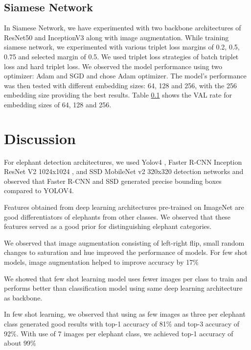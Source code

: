 \documentclass[10pt,twocolumn,letterpaper]{article}
\begin{document}
\subsection{Siamese Network}

In Siamese Network, we have  experimented with two backbone architectures of ResNet50 and InceptionV3 along with image augmentation. While training siamese network, we experimented with various triplet loss margins of 0.2, 0.5, 0.75 and selected margin of 0.5. We used triplet loss strategies of batch triplet loss and hard triplet loss. We observed the model performance using two optimizer: Adam and SGD and chose Adam optimizer. The model's performance was then tested with different embedding sizes: 64, 128 and 256, with the 256 embedding size providing the best results. Table \ref{} shows the VAL rate for embedding sizes of 64, 128 and 256.


\section{Discussion}
\label{sec:discussion}

For elephant detection architectures, we used Yolov4 \cite{yolov4}, Faster R-CNN Inception ResNet V2 1024x1024 \cite{fasterrcnn}, and SSD MobileNet v2 320x320 detection networks and observed that Faster R-CNN and SSD generated precise bounding boxes compared to YOLOV4.

Features obtained from deep learning architectures pre-trained on ImageNet are good differentiators of elephants from other classes. We observed that these features served as a good prior for distinguishing elephant categories. 

We observed that image augmentation consisting of left-right flip, small random changes to saturation and hue improved the performance of models. For few shot models, image augmentation helped to improve accuracy by 17\%

We showed that few shot learning model uses fewer images per class to train and performs better than classification model using same deep learning architecture as backbone.

In few shot learning, we observed that using as few images as three per elephant class generated good results with top-1 accuracy of 81\% and top-3 accuracy of 92\%. With use of 7 images per elephant class, we achieved top-1 accuracy of about 99\%
\end{document}
